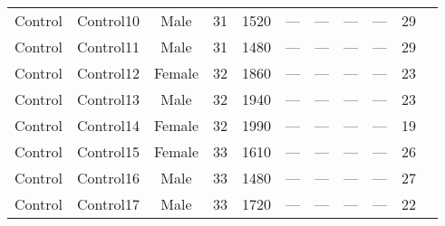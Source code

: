 \begin{sidewaystable}[h]
\begin{tabular}{cccccccp{2cm}ccc}
Control & Control10 & Male & 31 & 1520 & — & — & — & — & 29 \\
Control & Control11 & Male & 31 & 1480 & — & — & — & — & 29 \\
Control & Control12 & Female & 32 & 1860 & — & — & — & — & 23 \\
Control & Control13 & Male & 32 & 1940 & — & — & — & — & 23 \\
Control & Control14 & Female & 32 & 1990 & — & — & — & — & 19 \\
Control & Control15 & Female & 33 & 1610 & — & — & — & — & 26 \\
Control & Control16 & Male & 33 & 1480 & — & — & — & — & 27 \\
Control & Control17 & Male & 33 & 1720 & — & — & — & — & 22 \\

\hline %
\end{tabular}
\label{tab:2demograph}
\end{sidewaystable}
